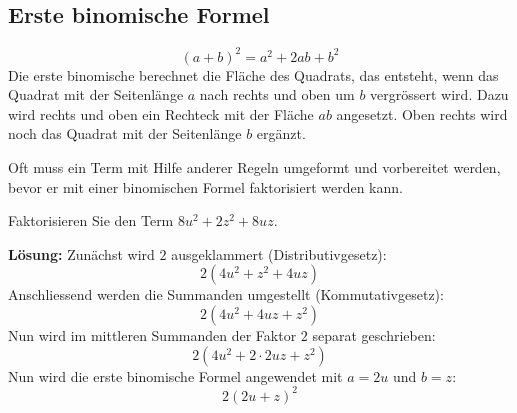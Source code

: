\subsection{Erste binomische Formel}
\[
  (a+b)^{2} = a^{2} + 2ab + b^{2}
\]
Die erste binomische berechnet die Fläche des Quadrats, das entsteht, wenn das Quadrat mit der Seitenlänge $a$ nach rechts und oben um $b$ vergrössert wird. Dazu wird rechts und oben ein Rechteck mit der Fläche $ab$ angesetzt. Oben rechts wird noch das Quadrat mit der Seitenlänge $b$ ergänzt.
\begin{center}
\end{center}
Oft muss ein Term mit Hilfe anderer Regeln umgeformt und vorbereitet werden, bevor er mit einer binomischen Formel faktorisiert werden kann.
\begin{example}
  Faktorisieren Sie den Term $8u^{2}+2z^{2}+8uz$.

  \textbf{Lösung:} Zunächst wird $2$ ausgeklammert (Distributivgesetz):
  \[
    2\left(4u^{2}+z^{2}+4uz\right)
  \]
  Anschliessend werden die Summanden umgestellt (Kommutativgesetz):
  \[
    2\left(4u^{2}+4uz+z^{2}\right)
  \]
  Nun wird im mittleren Summanden der Faktor $2$ separat geschrieben:
  \[
    2\left(4u^{2}+2\cdot 2uz+z^{2}\right)
  \]
  Nun wird die erste binomische Formel angewendet mit $a=2u$ und $b=z$:
  \[
    2(2u+z)^{2}
  \]
\end{example}

